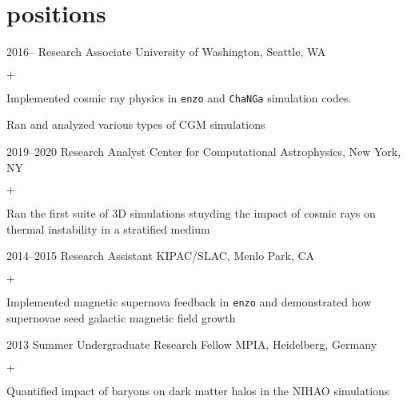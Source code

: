 \documentclass[]{luger-cv} %
\begin{document}
\section{positions}
\begin{entrylist}


\entry
{2016--}
{Research Associate}
{University of Washington, Seattle, WA}
{%
\vspace{-1em}
\begin{list}{$+$}{\cvlist}
\item Implemented cosmic ray physics in \texttt{enzo} and \texttt{ChaNGa} simulation codes.
\item Ran and analyzed various types of CGM simulations
\end{list}
}


\entry
{2019--2020}
{Research Analyst}
{Center for Computational Astrophysics, New York, NY}
{%
\vspace{-1em}
\begin{list}{$+$}{\cvlist}
\item Ran the first suite of 3D simulations stuyding the impact of cosmic rays on thermal instability in a stratified medium
\end{list}
}


\entry
{2014--2015}
{Research Assistant}
{KIPAC/SLAC, Menlo Park, CA}
{%
\vspace{-1em}
\begin{list}{$+$}{\cvlist}
\item Implemented magnetic supernova feedback in \texttt{enzo} and demonstrated how supernovae seed galactic magnetic field growth
\end{list}
}


\ifdefined \onepage \else
\entry
{2013}
{Summer Undergraduate Research Fellow}
{MPIA, Heidelberg, Germany}
{%
\vspace{-1em}
\begin{list}{$+$}{\cvlist}
\item Quantified impact of baryons on dark matter halos in the NIHAO simulations
\end{list}
}


\end{entrylist}
\end{document}
